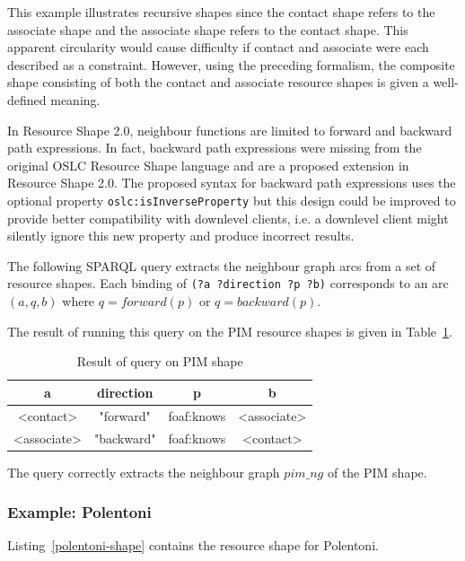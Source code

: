 \documentclass{article}
\begin{document}
This example illustrates recursive shapes since the contact shape refers to the associate shape and the associate
shape refers to the contact shape. This apparent circularity would cause difficulty if contact and associate were
each described as a constraint. However, using the preceding formalism, the composite shape consisting of both the contact and
associate resource shapes is given a well-defined meaning.

In Resource Shape 2.0, neighbour functions are limited to forward and backward path expressions.
In fact, backward path expressions were missing from the original OSLC Resource Shape language and are a proposed
extension in Resource Shape 2.0. The proposed syntax for backward path expressions uses the optional property
{\tt oslc:isInverseProperty} but this design could be improved to provide better compatibility with downlevel clients,
i.e. a downlevel client might silently ignore this new property and produce incorrect results.

The following SPARQL query extracts the neighbour graph arcs from a set of resource shapes.
 Each binding of {\tt (?a ?direction ?p ?b)} corresponds to an arc $(a, q, b)$ where $q=forward(p)$ or $q=backward(p)$.


The result of running this query on the PIM resource shapes is given in Table~\ref{result}.
\begin{table}[h]
\begin{center}
\begin{tt}
\begin{tabular}{|c|c|c|c|}
\hline
a			& direction	& p			& b \\
\hline
<contact>		& "forward"	& foaf:knows	& <associate> \\
<associate>	& "backward"	& foaf:knows	& <contact> \\
\hline
\end{tabular}
\end{tt}
\end{center}
\caption{Result of query on PIM shape}
\label{result}
\end{table}

The query correctly extracts the neighbour graph $pim\_ng$ of the PIM shape.

\subsubsection{Example: Polentoni}
Listing~\ref{polentoni-shape} contains the resource shape for Polentoni.

\end{document}
